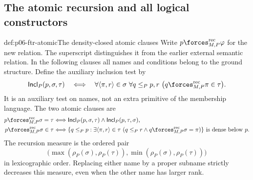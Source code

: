 \subsection{The atomic recursion and all logical constructors}

\begin{hbdefinition}{def:p06-ftr-atomic}{The density-closed atomic clauses}
Write \(p\forces^{\mathrm{rec}}_{M,P}\varphi\) for the new relation.
The superscript distinguishes it from the earlier external semantic
relation. In the following clauses all names and conditions belong to
the ground structure. Define the auxiliary inclusion test by
\[
 \mathsf{Incl}_P(p,\sigma,\tau)
 \quad\Longleftrightarrow\quad
 \forall\langle\pi,r\rangle\in\sigma\ \forall q\leq_P p,r\
       \bigl(q\forces^{\mathrm{rec}}_{M,P}\pi\in\tau\bigr).
\]
It is an auxiliary test on names, not an extra primitive of the membership
language. The two atomic clauses are
\[
\begin{aligned}
 p\forces^{\mathrm{rec}}_{M,P}\sigma=\tau
 &\Longleftrightarrow
   \mathsf{Incl}_P(p,\sigma,\tau)\land\mathsf{Incl}_P(p,\tau,\sigma),\\
 p\forces^{\mathrm{rec}}_{M,P}\sigma\in\tau
 &\Longleftrightarrow
   \{q\leq_P p:\exists\langle\pi,r\rangle\in\tau\
      (q\leq_P r\land q\forces^{\mathrm{rec}}_{M,P}\sigma=\pi)\}
       \text{ is dense below }p.
\end{aligned}
\]
The recursion measure is the ordered pair
\[
 \bigl(\max(\rho_P(\sigma),\rho_P(\tau)),
       \min(\rho_P(\sigma),\rho_P(\tau))\bigr)
\]
in lexicographic order. Replacing either name by a proper subname strictly
decreases this measure, even when the other name has larger rank.
\end{hbdefinition}

